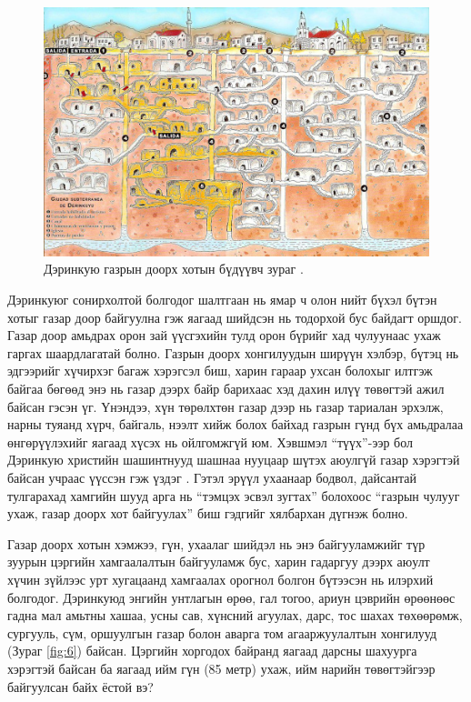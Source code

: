 \documentclass[10pt,twocolumn,letterpaper]{article}
\begin{document}
\begin{figure}[b]
\begin{center}
\includegraphics[width=1\linewidth]{derinkuyu.jpeg}
\end{center}
   \caption{Дэринкую газрын доорх хотын бүдүүвч зураг \cite{56}.}
\label{fig:5}
\label{fig:onecol}
\end{figure}

Дэринкуюг сонирхолтой болгодог шалтгаан нь ямар ч олон нийт бүхэл бүтэн хотыг газар доор байгуулна гэж яагаад шийдсэн нь тодорхой бус байдагт оршдог. Газар доор амьдрах орон зай үүсгэхийн тулд орон бүрийг хад чулуунаас ухаж гаргах шаардлагатай болно. Газрын доорх хонгилуудын ширүүн хэлбэр, бүтэц нь эдгээрийг хүчирхэг багаж хэрэгсэл биш, харин гараар ухсан болохыг илтгэж байгаа бөгөөд энэ нь газар дээрх байр барихаас хэд дахин илүү төвөгтэй ажил байсан гэсэн үг. Үнэндээ, хүн төрөлхтөн газар дээр нь газар тариалан эрхэлж, нарны туяанд хүрч, байгаль, нээлт хийж болох байхад газрын гүнд бүх амьдралаа өнгөрүүлэхийг яагаад хүсэх нь ойлгомжгүй юм. Хэвшмэл “түүх”-ээр бол Дэринкую христийн шашинтнууд шашнаа нууцаар шүтэх аюулгүй газар хэрэгтэй байсан учраас үүссэн гэж үздэг \cite{53}. Гэтэл эрүүл ухаанаар бодвол, дайсантай тулгарахад хамгийн шууд арга нь “тэмцэх эсвэл зугтах” болохоос “газрын чулууг ухаж, газар доорх хот байгуулах” биш гэдгийг хялбархан дүгнэж болно.

Газар доорх хотын хэмжээ, гүн, ухаалаг шийдэл нь энэ байгууламжийг түр зуурын цэргийн хамгаалалтын байгууламж бус, харин гадаргуу дээрх аюулт хүчин зүйлээс урт хугацаанд хамгаалах орогнол болгон бүтээсэн нь илэрхий болгодог. Дэринкуюд энгийн унтлагын өрөө, гал тогоо, ариун цэврийн өрөөнөөс гадна мал амьтны хашаа, усны сав, хүнсний агуулах, дарс, тос шахах төхөөрөмж, сургууль, сүм, оршуулгын газар болон аварга том агааржуулалтын хонгилууд (Зураг \ref{fig:6}) байсан. Цэргийн хоргодох байранд яагаад дарсны шахуурга хэрэгтэй байсан ба яагаад ийм гүн (85 метр) ухаж, ийм нарийн төвөгтэйгээр байгуулсан байх ёстой вэ?
\end{document}
